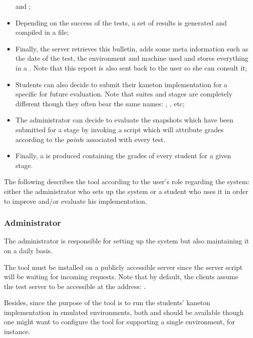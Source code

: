 \begin{itemize}
    and ;
  \item
    Depending on the success of the tests, a set of results is generated
    and compiled in a  file;
  \item
    Finally, the server retrieves this bulletin, adds some meta information
    such as the date of the test, the environment and machine used \etc{}
    and stores everything in a . Note that this report is
    also sent back to the user so she can consult it;
  \item
    Students can also decide to submit their kaneton implementation for
    a specific  for future evaluation. Note that suites and
    stages are completely different though they often bear the same names:
    , ,  etc{};
  \item
    The administrator can decide to evaluate the snapshots which have been
    submitted for a stage by invoking a script which will attribute grades
    according to the \textit{point}s associated with every test.
  \item
    Finally, a  is produced containing the grades of every
    student for a given stage.
\end{itemize}

The following describes the  tool according to the user's role
regarding the system: either the administrator who sets up the system or
a student who uses it in order to improve and/or evaluate his implementation.

%
%
\subsubsection{Administrator}

The administrator is responsible for setting up the system but also maintaining
it on a daily basis.


The  tool must be installed on a publicly accessible server since
the server script will be waiting for incoming requests. Note that by default,
the clients assume the test server to be accessible at the address:
.

Besides, since the purpose of the  tool is to run the students'
kaneton implementation in emulated environments, both  and
 should be available though one might want to configure the tool
for supporting a single environment,  for instance.

